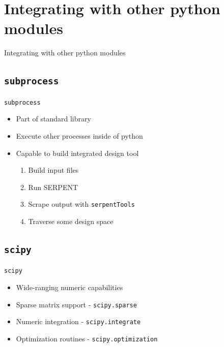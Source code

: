 \documentclass{beamer}
\newcommand{\st}{\texttt{serpentTools} }
\begin{document}
\section{Integrating with other python modules}

\begin{frame}{Integrating with other python modules}
        \tableofcontents[sectionstyle=show/hide,subsectionstyle=show/show/hide]
\end{frame}

\subsection{\texttt{subprocess}}

\begin{frame}{\texttt{subprocess}}
    \begin{itemize}
        \item{Part of standard library}
        \item{Execute other processes inside of python}
        \item{Capable to build integrated design tool}
        \begin{enumerate}
            \item{Build input files}
            \item{Run SERPENT}
            \item{Scrape output with \st}
            \item{Traverse some design space}
        \end{enumerate}
    \end{itemize}
\end{frame}

\subsection{\texttt{scipy}}

\begin{frame}{\texttt{scipy}}
    \begin{itemize}
        \item{Wide-ranging numeric capabilities}
        \item{Sparse matrix support - \texttt{scipy.sparse}}
        \item{Numeric integration - \texttt{scipy.integrate}}
        \item{Optimization routines - \texttt{scipy.optimization}}
    \end{itemize}
\end{frame}
\end{document}
